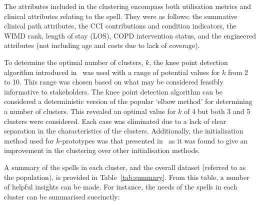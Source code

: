 The attributes included in the clustering encompass both utilisation metrics and
clinical attributes relating to the spell. They were as follows: the summative
clinical path attributes, the CCI contributions and condition indicators, the
WIMD rank, length of stay (LOS), COPD intervention status, and the engineered
attributes (not including age and costs due to lack of coverage).

To determine the optimal number of clusters, \(k\), the knee point detection
algorithm introduced in~\cite{Satopaa2011} was used with a range of potential
values for \(k\) from 2 to 10. This range was chosen based on what may be
considered feasibly informative to stakeholders. The knee point detection
algorithm can be considered a deterministic version of the popular `elbow
method' for determining a number of clusters. This revealed an optimal value for
\(k\) of 4 but both 3 and 5 clusters were considered. Each case was eliminated
due to a lack of clear separation in the characteristics of the clusters.
Additionally, the initialisation method used for \(k\)-prototypes was that
presented in~\cite{Wilde2020} as it was found to give an improvement in the
clustering over other initialisation methods.

\begin{table}
    \centering
    \resizebox{\textwidth}{!}{%
        
    }\caption{%
        A summary of clinical and condition-specific characteristics for each
        cluster and the population.
    }\label{tab:summary}
\end{table}

A summary of the spells in each cluster, and the overall dataset (referred to as
the population), is provided in Table~\ref{tab:summary}. From this table, a
number of helpful insights can be made. For instance, the needs of the spells in
each cluster can be summarised succinctly:

